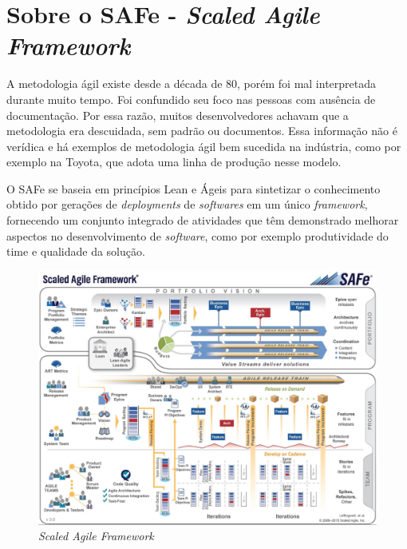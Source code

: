 \section{Sobre o SAFe - \textit{Scaled Agile Framework}}

A metodologia ágil existe desde a década de 80, porém foi mal interpretada durante muito tempo. Foi confundido seu foco nas pessoas com ausência de documentação. Por essa razão, muitos desenvolvedores achavam que a metodologia era descuidada, sem padrão ou documentos. Essa informação não é verídica e há exemplos de metodologia ágil bem sucedida na indústria, como por exemplo na Toyota, que adota uma linha de produção nesse modelo.~\cite{dev2}

O SAFe se baseia em princípios Lean e Ágeis para sintetizar o conhecimento obtido por gerações de \textit{deployments} de \textit{softwares} em um único \textit{framework}, fornecendo um conjunto integrado de atividades que têm demonstrado melhorar aspectos no desenvolvimento de \textit{software}, como por exemplo produtividade do time e qualidade da solução.~\cite{safe}

\begin{figure}[h]
\centering
  \includegraphics[keepaspectratio=true,scale=0.2]
  {figuras/safe.eps}
  \caption{\textit{Scaled Agile Framework}}
  \label{safe}
\end{figure}

